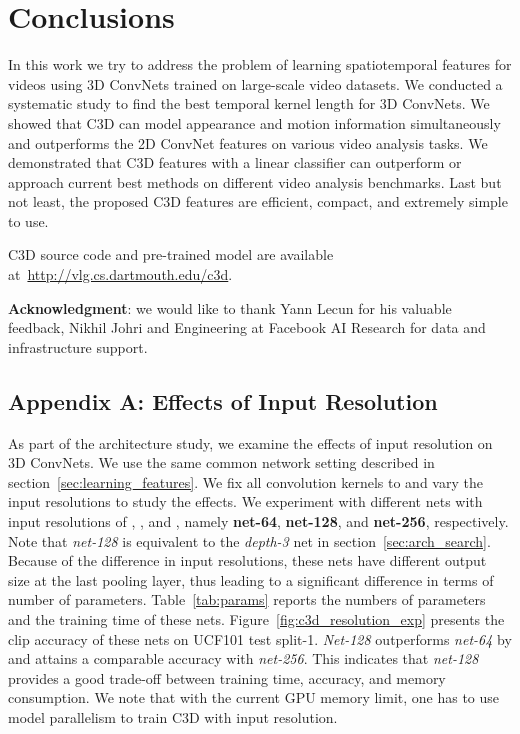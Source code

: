 \documentclass[10pt,twocolumn,letterpaper]{article}
\begin{document}
\section{Conclusions}
\label{sec:conclusion}
In this work we try to address the problem of learning spatiotemporal features for videos using 3D ConvNets trained on large-scale video datasets. We conducted a systematic study to find the best temporal kernel length for 3D ConvNets. We showed that C3D can model appearance and motion information simultaneously and outperforms the 2D ConvNet features on various video analysis tasks. We demonstrated that C3D features with a linear classifier can outperform or approach current best methods on different video analysis benchmarks. Last but not least, the proposed C3D features are efficient, compact, and extremely simple to use.

C3D source code and pre-trained model are available at~\url{http://vlg.cs.dartmouth.edu/c3d}.

{\bf Acknowledgment}: we would like to thank Yann Lecun for his valuable feedback, Nikhil Johri and Engineering at Facebook AI Research for data and infrastructure support. 
\subsection*{Appendix A: Effects of Input Resolution}

As part of the architecture study, we examine the effects of input resolution on 3D ConvNets. We use the same common network setting described in section~\ref{sec:learning_features}. We fix all convolution kernels to  and vary the input resolutions to study the effects. We experiment with  different nets with input resolutions of , , and , namely {\bf net-64}, {\bf net-128}, and {\bf net-256}, respectively. Note that \emph{net-128} is equivalent to the \emph{depth-3} net in section~\ref{sec:arch_search}. Because of the difference in input resolutions, these nets have different output size at the last pooling layer, thus leading to a significant difference in terms of number of parameters. Table~\ref{tab:params} reports the numbers of parameters and the training time of these nets. Figure~\ref{fig:c3d_resolution_exp} presents the clip accuracy of these nets on UCF101 test split-1. \emph{Net-128} outperforms \emph{net-64} by  and attains a comparable accuracy with \emph{net-256}. This indicates that \emph{net-128} provides a good trade-off between training time, accuracy, and memory consumption. We note that with the current GPU memory limit, one has to use model parallelism to train C3D with  input resolution.
\end{document}
